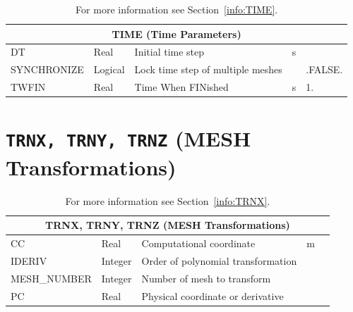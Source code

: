 \documentclass[11pt]{book}
\begin{document}
\begin{table}[H]
\caption{For more information see Section~\ref{info:TIME}.}\label{tbl:TIME}
\noindent
\begin{tabular*}{\textwidth}{@{\extracolsep{\fill}}|l|l|l|l|l|}
\hline
\multicolumn{5}{|c|}{{\ct TIME} (Time Parameters)} \\ \hline \hline
{\ct DT    }      & Real        & Initial time step                  & s           &     \\ \hline
{\ct SYNCHRONIZE} & Logical     & Lock time step of multiple meshes  &             & {\ct .FALSE.}    \\ \hline
{\ct TWFIN }      & Real        & Time When FINished                 & s           & 1.  \\ \hline
\end{tabular*}
\end{table}

\vspace{\baselineskip}

\vfill

\section{\texorpdfstring{{\tt TRNX, TRNY, TRNZ}}{TRNX, TRNY, TRNZ} (MESH Transformations)}

\hspace{1in}

\begin{table}[H]
\caption{For more information see Section~\ref{info:TRNX}.}\label{tbl:TRNX}
\noindent
\begin{tabular*}{\textwidth}{@{\extracolsep{\fill}}|l|l|l|l|l|}
\hline
\multicolumn{5}{|c|}{{\ct TRNX, TRNY, TRNZ} (MESH Transformations)} \\ \hline \hline
{\ct CC    }            & Real          & Computational coordinate           & m            &     \\ \hline
{\ct IDERIV}            & Integer       & Order of polynomial transformation &              &     \\ \hline
{\ct MESH\_NUMBER}      & Integer       & Number of mesh to transform        &              &     \\ \hline
{\ct PC    }            & Real          & Physical coordinate or derivative  &              &     \\ \hline
\end{tabular*}
\end{table}

\vspace{\baselineskip}
\end{document}
